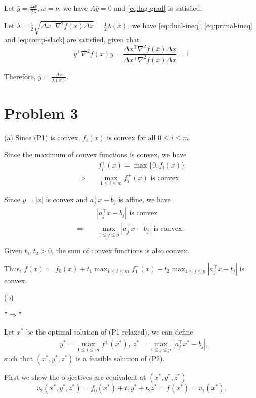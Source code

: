 \documentclass[11pt]{article}
\newcommand{\hess}{\nabla^2}
\newcommand{\half}{\frac{1}{2}} %
\newcommand{\T}{^\top}          %
\begin{document}
Let $\bar{y} = \frac{\Delta x}{2\lambda}, w=\nu$, we have $A\bar{y} = 0$ and \eqref{eq:lag-grad} is satisfied.

Let $\lambda = \half \sqrt{\Delta x\T \hess f(\bar{x})\Delta x} = \half \lambda (\bar{x})$, we have \eqref{eq:dual-ineq}, \eqref{eq:primal-ineq} and \eqref{eq:comp-slack} are satisfied, given that
$$\bar{y}\T\hess f(x)y = \frac{\Delta x\T \hess f(\bar{x})\Delta x}{\Delta x\T \hess f(\bar{x})\Delta x} = 1$$

Therefore, $\bar{y} = \frac{\Delta x}{\lambda(\bar{x})}$.


\clearpage
\section*{Problem 3}

(a)
Since (P1) is convex, $f_i(x)$ is convex for all $0 \leq i \leq m$.

Since the maximum of convex functions is convex, we have
\begin{align*}
  &f_i^{+}(x) =\max \{0, f_i(x)\}\\
  \Rightarrow\quad &\max _{1 \leq i \leq m} f_i^{+}(x) \text{ is convex.}
\end{align*}

Since $y=|x|$ is convex and $a_j^{\top} x-b_j$ is affine, we have
$$
\begin{aligned}
& \left|a_j^{\top} x-b_j\right| \text { is convex} \\
\Rightarrow \quad & \max _{1\leq j\leq p}\left|a_j^{\top} x-b_j\right| \text { is convex. }
\end{aligned}
$$

Given $t_1, t_2>0$, the sum of convex functions is also convex.

Thus, $f(x):=f_0(x)+t_1 \max_{1 \leq i \leq m} f_1^{+}(x)+t_2 \max _{1 \leq j \leq p} |a_j^{\top} x-t_j|$ is convex.

(b)

$"\Rightarrow"$

Let $x^*$ be the optimal solution of (P1-relaxed), we can define
$$
\begin{aligned}
& y^*=\max _{1 \leq i \leq m} f^{+}\left(x^*\right), \ z^*=\max _{1 \leq j \leq p}\left|a_j^{\top} x^*-b_j\right|,
\end{aligned}
$$
such that $\left(x^*, y^*, z^*\right)$ is a feasible solution of (P2).

First we show the objectives are equivalent at $\left(x^*, y^*, z^*\right)$
$$v_2\left(x^*, y^*, z^*\right) = f_0\left(x^*\right) + t_1 y^* + t_2 z^* = f\left(x^*\right) = v_1\left(x^*\right).$$
\end{document}
